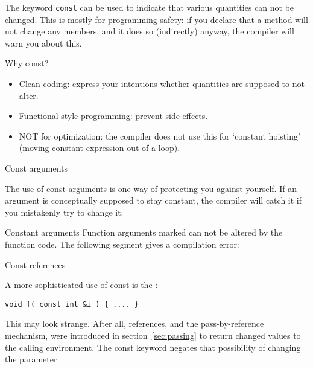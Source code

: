 
The keyword \lstinline{const} can be used to indicate that various quantities
can not be changed. This is mostly for programming safety: if you
declare that a method will not change any members, and it does so
(indirectly) anyway, the compiler will warn you about this.

\begin{slide}{Why const?}
  \label{sl:why-const}
  \begin{itemize}
  \item Clean coding: express your intentions whether quantities are
    supposed to not alter.
  \item Functional style programming: prevent side effects.
  \item NOT for optimization: the compiler does not use this for `constant
    hoisting' (moving constant expression out of a loop).
  \end{itemize}
\end{slide}

 {Const arguments}
\label{sec:constparam}

The use of const arguments is one way of protecting you against yourself.
If an argument is conceptually supposed to stay constant, the compiler
will catch it if you mistakenly try to change it.

\begin{block}{Constant arguments}
  \label{sl:const-arg}
  Function arguments marked  can not be altered by
  the function code. The following segment gives a compilation error:
\end{block}

 {Const references}
\label{sec:const-ref}

A more sophisticated use of const is the
:
\begin{lstlisting}
void f( const int &i ) { .... }
\end{lstlisting}
This may look strange. After all, references, and the
pass-by-reference mechanism, were introduced in
section~\ref{sec:passing} to return changed values to the calling
environment. The const keyword negates that possibility of changing
the parameter.

